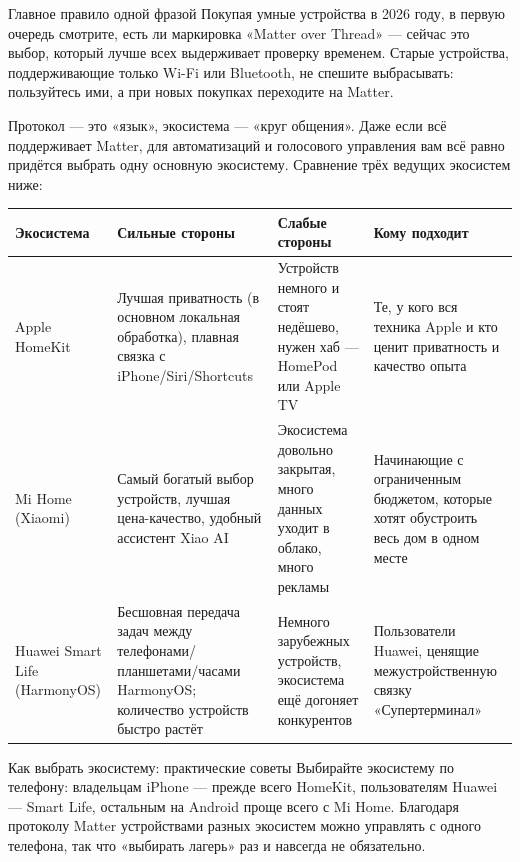 \begin{tcbinfo}{Главное правило одной фразой}
Покупая умные устройства в 2026 году, в первую очередь смотрите, есть ли маркировка «Matter over Thread» — сейчас это выбор, который лучше всех выдерживает проверку временем. Старые устройства, поддерживающие только Wi-Fi или Bluetooth, не спешите выбрасывать: пользуйтесь ими, а при новых покупках переходите на Matter.

\end{tcbinfo}


Протокол — это «язык», экосистема — «круг общения». Даже если всё поддерживает Matter, для автоматизаций и голосового управления вам всё равно придётся выбрать одну основную экосистему. Сравнение трёх ведущих экосистем ниже:

\begin{center}
\begin{tabularx}{\linewidth}{|X|X|X|X|}
\hline
\textbf{Экосистема} & \textbf{Сильные стороны} & \textbf{Слабые стороны} & \textbf{Кому подходит} \tabularnewline
\hline
Apple HomeKit & Лучшая приватность (в основном локальная обработка), плавная связка с iPhone/Siri/Shortcuts & Устройств немного и стоят недёшево, нужен хаб — HomePod или Apple TV & Те, у кого вся техника Apple и кто ценит приватность и качество опыта \tabularnewline
Mi Home (Xiaomi) & Самый богатый выбор устройств, лучшая цена-качество, удобный ассистент Xiao AI & Экосистема довольно закрытая, много данных уходит в облако, много рекламы & Начинающие с ограниченным бюджетом, которые хотят обустроить весь дом в одном месте \tabularnewline
Huawei Smart Life (HarmonyOS) & Бесшовная передача задач между телефонами/планшетами/часами HarmonyOS; количество устройств быстро растёт & Немного зарубежных устройств, экосистема ещё догоняет конкурентов & Пользователи Huawei, ценящие межустройственную связку «Супертерминал» \tabularnewline
\hline
\end{tabularx}
\end{center}

\begin{tcbinfo}{Как выбрать экосистему: практические советы}
Выбирайте экосистему по телефону: владельцам iPhone — прежде всего HomeKit, пользователям Huawei — Smart Life, остальным на Android проще всего с Mi Home. Благодаря протоколу Matter устройствами разных экосистем можно управлять с одного телефона, так что «выбирать лагерь» раз и навсегда не обязательно.

\end{tcbinfo}

